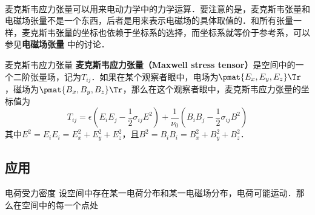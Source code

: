
\


麦克斯韦应力张量可以用来电动力学中的力学运算．要注意的是，麦克斯韦张量和电磁场张量不是一个东西，后者是用来表示电磁场的具体取值的．和所有张量一样，麦克斯韦张量的坐标也依赖于坐标系的选择，而坐标系就等价于参考系，可以参见\textbf{电磁场张量} 中的讨论．

\begin{definition}{麦克斯韦应力张量}
\textbf{麦克斯韦应力张量（Maxwell stress tensor）}是空间中的一个二阶张量场，记为$T_{ij}$．如果在某个观察者眼中，电场为$\pmat{E_x, E_y, E_z}\Tr$，磁场为$\pmat{B_x, B_y, B_z}\Tr$，那么在这个观察者眼中，麦克斯韦应力张量的坐标值为
\begin{equation}
T_{ij}=\epsilon(E_iE_j-\frac{1}{2}\sigma_{ij}E^2)+\frac{1}{\nu_0}(B_iB_j-\frac{1}{2}\sigma_{ij}B^2)
\end{equation}
其中$E^2=E_iE_i=E_x^2+E_y^2+E_z^2$，且$B^2=B_iB_i=B_x^2+B_y^2+B_z^2$．
\end{definition}


\subsection{应用}

\begin{theorem}{电荷受力密度}
设空间中存在某一电荷分布和某一电磁场分布，电荷可能运动．那么在空间中的每一个点处
\end{theorem}






